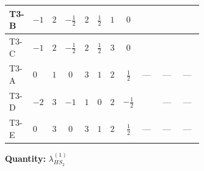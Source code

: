 \documentclass[8pt]{article}
\begin{document}
\begin{landscape}
\begin{longtable}{@{}llcccccc >{\raggedright\arraybackslash}p{0.21\linewidth} >{\raggedright\arraybackslash}p{0.21\linewidth} >{\raggedright\arraybackslash}p{0.21\linewidth}@{}}
T3-B & $-1$ & $2$ & $-\frac{1}{2}$ & $2$ & $\frac{1}{2}$ & $1$ & $0$ & \scriptsize\adjustbox{max width=\linewidth}{$\begin{gathered} {\lambda_{HS_2}^{(1)}} (6 \operatorname{Tr}\!\left({Y_d}\,\left({Y_d}\right)^{\dagger}\right)+2 \operatorname{Tr}\!\left({Y_e}\,\left({Y_e}\right)^{\dagger}\right)+6 \operatorname{Tr}\!\left({Y_u}\,\left({Y_u}\right)^{\dagger}\right))\end{gathered}$} & \scriptsize\adjustbox{max width=\linewidth}{$\begin{gathered} +3 {\lambda_{10}} \left({\lambda_{H H^\dagger S_1^\dagger S_2^\dagger}^{\rm Cross}}\right)^{*}\end{gathered}$} & \scriptsize\adjustbox{max width=\linewidth}{$\begin{gathered} +{\lambda_{H H^\dagger S_1^\dagger S_2^\dagger}^{\rm Cross}} (4 \left({\lambda_{H H^\dagger S_1^\dagger S_2^\dagger}^{\rm Cross}}\right)^{*}+3 \left({\lambda_{10}}\right)^{*})\end{gathered}$} \\
\midrule
T3-C & $-1$ & $2$ & $-\frac{1}{2}$ & $2$ & $\frac{1}{2}$ & $3$ & $0$ & \scriptsize\adjustbox{max width=\linewidth}{$\begin{gathered} {\lambda_{HS_2}^{(1)}} (6 \operatorname{Tr}\!\left({Y_d}\,\left({Y_d}\right)^{\dagger}\right)+2 \operatorname{Tr}\!\left({Y_e}\,\left({Y_e}\right)^{\dagger}\right)+6 \operatorname{Tr}\!\left({Y_u}\,\left({Y_u}\right)^{\dagger}\right))\end{gathered}$} & \scriptsize\adjustbox{max width=\linewidth}{$\begin{gathered} +3 {\lambda_{10}} \left({\lambda_{H H^\dagger S_1^\dagger S_2^\dagger}^{\rm Cross}}\right)^{*}\end{gathered}$} & \scriptsize\adjustbox{max width=\linewidth}{$\begin{gathered} +{\lambda_{H H^\dagger S_1^\dagger S_2^\dagger}^{\rm Cross}} (4 \left({\lambda_{H H^\dagger S_1^\dagger S_2^\dagger}^{\rm Cross}}\right)^{*}+3 \left({\lambda_{10}}\right)^{*})\end{gathered}$} \\
\midrule
T3-A & $0$ & $1$ & $0$ & $3$ & $1$ & $2$ & $\frac{1}{2}$ & --- & --- & --- \\
\midrule
T3-D & $-2$ & $3$ & $-1$ & $1$ & $0$ & $2$ & $-\frac{1}{2}$ & \scriptsize\adjustbox{max width=\linewidth}{$\begin{gathered} {\lambda_{HS_2}^{(1)}} (6 \operatorname{Tr}\!\left({Y_d}\,\left({Y_d}\right)^{\dagger}\right)+2 \operatorname{Tr}\!\left({Y_e}\,\left({Y_e}\right)^{\dagger}\right)+6 \operatorname{Tr}\!\left({Y_u}\,\left({Y_u}\right)^{\dagger}\right))\end{gathered}$} & --- & --- \\
\midrule
T3-E & $0$ & $3$ & $0$ & $3$ & $1$ & $2$ & $\frac{1}{2}$ & --- & --- & --- \\
\midrule
\bottomrule
\end{longtable}
\clearpage
\noindent\textbf{Quantity: }$\lambda_{HS_2}^{(1)}$\par\smallskip

\end{landscape}
\end{document}
